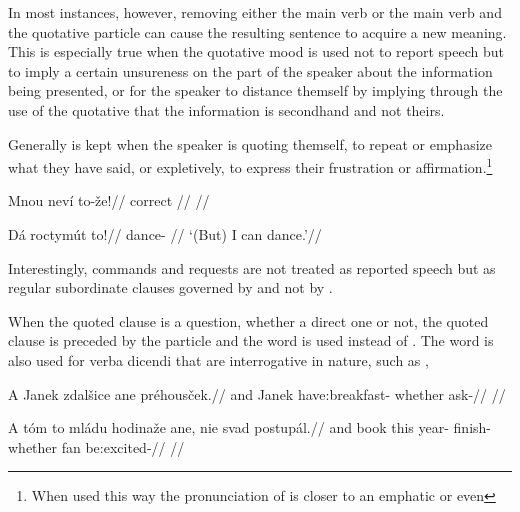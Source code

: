 In most instances, however, removing either the main verb or the main verb and the quotative particle can cause the resulting sentence to acquire a new meaning. This is especially true when the quotative mood is used not to report speech but to imply a certain unsureness on the part of the speaker about the information being presented, or for the speaker to distance themself by implying through the use of the quotative that the information is secondhand and not theirs.

Generally  is kept when the speaker is quoting themself, to repeat or emphasize what they have said, or expletively, to express their frustration or affirmation.\footnote{When used this way the pronunciation of  is closer to an emphatic  or even }


\pex
\begingl
\gla Mnou neví to-že!//
\glb correct  //
\glft {}//
\endgl
\xe

\pex
\begingl
\gla Dá roctymút to!//
\glb {} dance- //
\glft `(But) I can dance.'//
\endgl
\xe


Interestingly, commands and requests are not treated as reported speech but as regular subordinate clauses governed by  and not by .

When the quoted clause is a question, whether a direct one or not, the quoted clause is preceded by the particle  and the word  is used instead of . The word  is also used for verba dicendi that are interrogative in nature, such as ,

\pex
\begingl
  \gla A Janek zdalšice ane préhousček.//
  \glb and Janek have:breakfast- whether ask-//
  \glft {}//
\endgl
\xe

\pex
\begingl
  \gla A t\'om to mládu hodinaže ane, nie svad postupál.//
  \glb and book this year- finish- whether  fan be:excited-//
  \glft {}//
\endgl
\xe

